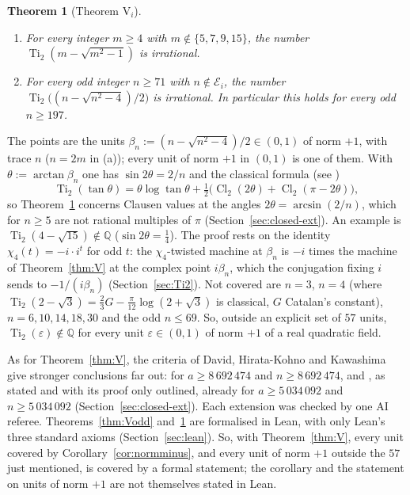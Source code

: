 \documentclass[11pt]{amsart}
\newtheorem{theorem}{Theorem}[section]
\theoremstyle{definition}
\theoremstyle{remark}
\numberwithin{equation}{section}
\newcommand{\QQ}{\mathbb{Q}}
\newcommand{\cE}{\mathcal{E}}
\newcommand{\eps}{\varepsilon}
\newcommand{\Ti}{\operatorname{Ti}}
\newcommand{\Cl}{\operatorname{Cl}}
\begin{document}
\begin{theorem}[Theorem V$_i$]\label{thm:Vi}
\begin{enumerate}
\item[(a)] For every integer $m\ge4$ with $m\notin\{5,7,9,15\}$, the number $\Ti_2(m-\sqrt{m^2-1})$ is irrational.
\item[(b)] For every odd integer $n\ge71$ with $n\notin\cE_i$, the number $\Ti_2\bigl((n-\sqrt{n^2-4})/2\bigr)$ is
  irrational. In particular this holds for every odd $n\ge197$.
\end{enumerate}
\end{theorem}

The points are the units $\beta_n:=(n-\sqrt{n^2-4})/2\in(0,1)$ of norm $+1$, with trace $n$ ($n=2m$ in (a)); every unit
of norm $+1$ in $(0,1)$ is one of them. With $\theta:=\arctan\beta_n$ one has $\sin2\theta=2/n$ and the classical formula (see \cite{Lewin1981})
\[
  \Ti_2(\tan\theta)=\theta\log\tan\theta+\tfrac12\bigl(\Cl_2(2\theta)+\Cl_2(\pi-2\theta)\bigr),
\]
so Theorem~\ref{thm:Vi}
concerns Clausen values at the angles $2\theta=\arcsin(2/n)$, which for $n\ge5$ are not rational multiples of $\pi$
(Section~\ref{sec:closed-ext}). An example is $\Ti_2(4-\sqrt{15})\notin\QQ$ ($\sin2\theta=\frac14$). The proof rests on
the identity $\chi_4(t)=-i\cdot i^t$ for odd $t$: the $\chi_4$-twisted machine at $\beta_n$ is $-i$ times the machine of
Theorem~\ref{thm:V} at the complex point $i\beta_n$, which the conjugation fixing $i$ sends to $-1/(i\beta_n)$
(Section~\ref{sec:Ti2}). Not covered are $n=3$, $n=4$ (where
$\Ti_2(2-\sqrt3)=\frac23G-\frac\pi{12}\log(2+\sqrt3)$ is classical, $G$ Catalan's constant), $n=6,10,14,18,30$ and the
odd $n\le69$. So, outside an explicit set of $57$ units, $\Ti_2(\eps)\notin\QQ$ for every unit $\eps\in(0,1)$ of norm
$+1$ of a real quadratic field.

As for Theorem~\ref{thm:V}, the criteria of David, Hirata-Kohno and Kawashima give stronger conclusions far out:
\cite[Thm.~1]{DHK2022b} for $a\ge8\,692\,474$ and $n\ge8\,692\,474$, and \cite[Thm.~2.1]{DHK2020}, as stated and with
its proof only outlined, already for $a\ge5\,034\,092$ and $n\ge5\,034\,092$ (Section~\ref{sec:closed-ext}). Each extension was checked by one AI referee.
Theorems~\ref{thm:Vodd} and~\ref{thm:Vi} are formalised in Lean, with only Lean's three standard axioms
(Section~\ref{sec:lean}). So, with Theorem~\ref{thm:V}, every unit covered by Corollary~\ref{cor:normminus}, and every
unit of norm $+1$ outside the $57$ just mentioned, is covered by a formal statement; the corollary and the statement on
units of norm $+1$ are not themselves stated in Lean.
\end{document}

